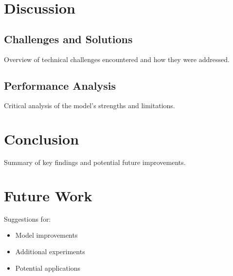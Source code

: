 \documentclass[12pt,a4paper]{article}
\begin{document}
\section{Discussion}
\subsection{Challenges and Solutions}
Overview of technical challenges encountered and how they were addressed.

\subsection{Performance Analysis}
Critical analysis of the model's strengths and limitations.

\section{Conclusion}
Summary of key findings and potential future improvements.

\section{Future Work}
Suggestions for:
\begin{itemize}
    \item Model improvements
    \item Additional experiments
    \item Potential applications
\end{itemize}

\printbibliography
\end{document}

